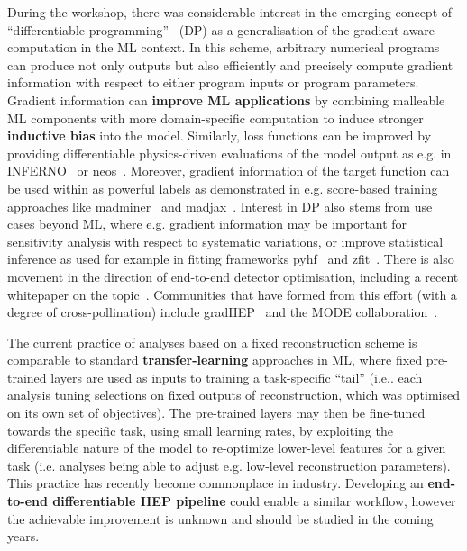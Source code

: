 \documentclass[a4paper,11pt]{article}
\begin{document}
During the workshop, there was considerable interest in the emerging
concept of
``differentiable
programming''~\cite{Baydin2020DifferentiablePI} (DP) as a generalisation of the gradient-aware
computation in the ML context. In this scheme, arbitrary numerical
programs can produce not only outputs but also efficiently and precisely
compute gradient information with respect to either program inputs or
program parameters. Gradient information can \textbf{improve ML
applications} by combining malleable ML components with more
domain-specific computation to induce stronger \textbf{inductive bias}
into the model. Similarly, loss functions can be improved by providing
differentiable physics-driven evaluations of the model output as e.g. in
INFERNO~\cite{de_Castro_2019} or
neos~\cite{NEOS}. Moreover,
gradient information of the target function can be used within as
powerful labels as demonstrated in e.g. score-based training approaches
like madminer~\cite{https://doi.org/10.48550/arxiv.1907.10621} and
madjax~\cite{madjax}. Interest in
DP also stems from use cases beyond ML, where e.g. gradient information
may be important for sensitivity analysis with respect to systematic
variations, or improve statistical inference as used for example in
fitting frameworks pyhf~\cite{pyhf,pyhf_joss} and zfit~\cite{Eschle:2019jmu}.
There is also
movement in the direction of end-to-end detector optimisation, including
a recent whitepaper on
the topic~\cite{https://doi.org/10.48550/arxiv.2203.13818}. Communities that have formed from this effort (with a
degree of cross-pollination) include
gradHEP~\cite{gradhep} and the
MODE
collaboration~\cite{MODE:2021yid}.

The current practice of analyses based on a fixed reconstruction scheme
is comparable to standard \textbf{transfer-learning} approaches in ML,
where fixed pre-trained layers are used as inputs to training a
task-specific ``tail'' (i.e.. each analysis tuning selections on fixed
outputs of reconstruction, which was optimised on its own set of
objectives). The pre-trained layers may then be fine-tuned towards the
specific task, using small learning rates, by exploiting the
differentiable nature of the model to re-optimize lower-level features
for a given task (i.e. analyses being able to adjust e.g. low-level
reconstruction parameters). This practice has recently become
commonplace in industry. Developing an \textbf{end-to-end differentiable
HEP pipeline} could enable a similar workflow, however the achievable
improvement is unknown and should be studied in the coming years.
\end{document}

